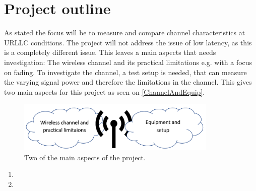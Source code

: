 \section{Project outline}

As stated the focus will be to measure and compare channel characteristics at URLLC conditions. The project will not address the issue of low latency, as this is a completely different issue. This leaves a main aspects that needs investigation: The wireless channel and its practical limitations e.g. with a focus on fading. To investigate the channel, a test setup is needed, that can measure the varying signal power and therefore the limitations in the channel. This gives two main aspects for this project as seen on \autoref{ChannelAndEquip}.

\begin{figure}[H]
\centering
\includegraphics[width=0.85\textwidth]{figures/ProOutline.png}
\caption{Two of the main aspects of the project.}
\label{ChannelAndEquip}
\end{figure}



\begin{enumerate}
	\item 
	\item 
\end{enumerate}
 




